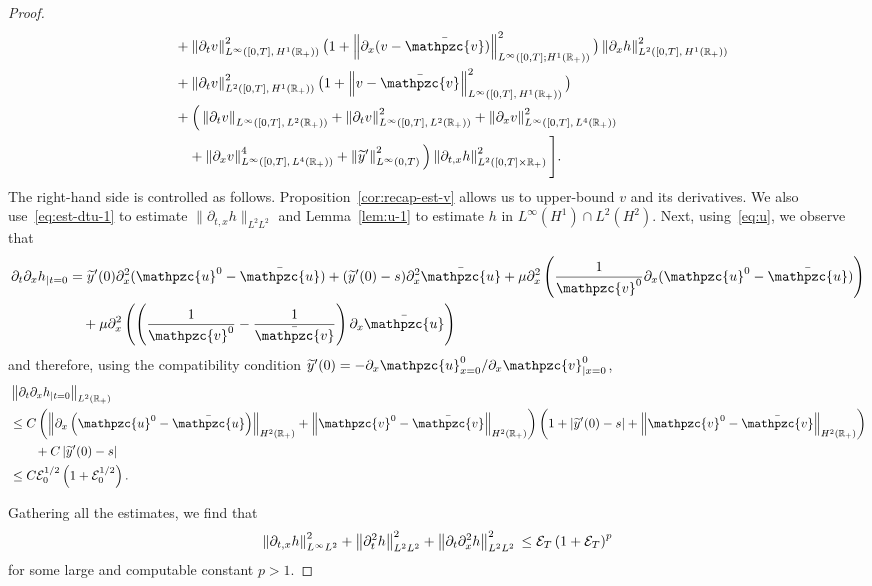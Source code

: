 \documentclass[AHL,Unicode,longabstracts,published]{cedram}
\newcommand{\R}{\mathbb{R}}
\newcommand{\p}{\partial}
\newcommand{\bv}{\bar{\mathpzc{v}}}
\newcommand{\bu}{\bar{\mathpzc{u}}}
\newcommand{\cE}{\mathcal E}
\newcommand{\tv}{\mathpzc{v}}
\newcommand{\tu}{\mathpzc{u}}
\newcommand{\ty}{\widetilde{y}}
\begin{document}
\begin{proof}
\begin{align*}
& \qquad + \left\|\p_t v\right\|_{L^\infty\left([0,T],\,H^1(\R_+)\right)}^2 \big(1+ \left\|\p_x (v-\bv)\right\|_{L^\infty\left([0,T];H^1(\R_+)\right)}^2\big) \left\|\p_xh\right\|_{L^2\left([0,T],\,H^1(\R_+)\right)}^2 \\
& \qquad + \left\|\p_t v\right\|_{L^2\left([0,T],\,H^1(\R_+)\right)}^2\big(1+ \left\|v-\bv\right\|_{L^\infty\left([0,T],\,H^1(\R_+)\right)}^2\big) \\
& \qquad + \Big(\left\|\partial_t v\right\|_{L^\infty\left([0,T],\,L^2(\R_+)\right)} + \left\|\partial_t v\right\|_{L^\infty\left([0,T],\,L^2(\R_+)\right)}^2+ \left\|\partial_x v\right\|_{L^\infty \left([0,T],\,L^4(\R_+)\right)}^2\\
&\qquad \quad+ \left\|\partial_x v\right\|_{L^\infty \left([0,T],\,L^4(\R_+)\right)}^4 + \left\|\ty'\right\|_{L^\infty(0,T)}^2\Big) \left\|\partial_{t,x}h\right\|_{L^2\left([0,T] \times \R_+\right)}^2 \Bigg].
\end{align*}
\endgroup
The right-hand side is controlled as follows. Proposition~\ref{cor:recap-est-v} allows us to upper-bound $v$ and its derivatives. We also use~\eqref{eq:est-dtu-1} to estimate $\|\partial_{t,x}h\|_{L^2 L^2}$ and Lemma~\ref{lem:u-1} to estimate $h$ in $L^\infty(H^1)\cap L^2(H^2)$. Next, using~\eqref{eq:u}, we observe that
\begin{align*}
\partial_t \partial_xh_{|t=0} &=\ty'(0) \p_x^2(\tu^0 - \bu) + (\ty'(0)-s)\p_x^2\bu + \mu \partial^2_x\left(\frac{1}{\tv^0}\partial_x (\tu^0 -\bu)\right)\\&\quad + \mu \partial^2_x\left(\left(\frac{1}{\tv^0} - \frac{1}{\bv}\right) \partial_x \bu\right)
\end{align*}
and therefore, using the compatibility condition $\ty'(0)=-\p_x \tu^0_{x=0}/\p_x \tv^0_{|x=0}$,
\begin{align*}
& \left\|\partial_t \partial_xh_{|t=0}\right\|_{L^2(\R_+)} \\
& \leq C \left(\left\|\partial_x \left(\tu^0-\bu\right)\right\|_{H^2(\R_+)} + \left\|\tv^0-\bv\right\|_{H^2(\R_+)}\right)\left(1 + \left|\ty'(0)-s\right| + \left\|\tv^0-\bv\right\|_{H^2(\R_+)}\right) \\
& \qquad + C \left|\ty'(0) - s\right|\\
&\leq C \cE_0^{1/2} \left(1+ \cE_0^{1/2}\right).
\end{align*}

Gathering all the estimates, we find that
\[
\left\|\partial_{t,x}h\right\|_{L^\infty L^2}^2 + \left\|\partial^2_th\right\|_{L^2 L^2}^2 + \left\|\partial_t \partial^2_xh\right\|_{L^2 L^2}^2 \\
\leq \cE_T\left(1 + \cE_T\right)^p
\]
for some large and computable constant $p>1$.
\end{proof}
\end{document}

